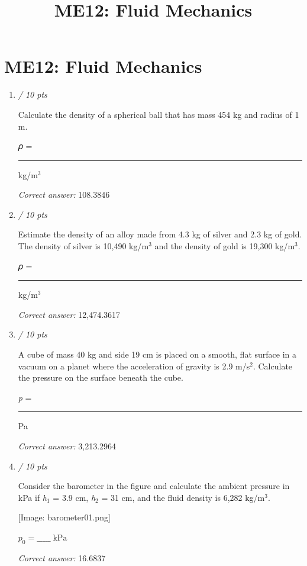 \documentclass[11pt]{article}
\title{ME12: Fluid Mechanics}
\author{}
\date{}
\begin{document}
\maketitle

\section*{ME12: Fluid Mechanics}

\begin{enumerate}[leftmargin=*,label=\textbf{Question \arabic*.}]
\item \hfill \textit{/ 10 pts}

Calculate the density of a spherical ball that has mass 454 kg and radius of 1 m.



𝜌 = \rule{2cm}{0.4pt} kg/m$^{3}$

\textit{Correct answer: } 108.3846

\item \hfill \textit{/ 10 pts}

Estimate the density of an alloy made from 4.3 kg of silver and 2.3 kg of gold. The density of silver is 10,490 kg/m$^{3}$ and the density of gold is 19,300 kg/m$^{3}$.



𝜌 = \rule{2cm}{0.4pt} kg/m$^{3}$

\textit{Correct answer: } 12,474.3617

\item \hfill \textit{/ 10 pts}

A cube of mass 40 kg and side 19 cm is placed on a smooth, flat surface in a vacuum on a planet where the acceleration of gravity is 2.9 m/s$^{2}$. Calculate the pressure on the surface beneath the cube.



\emph{p} =\rule{2cm}{0.4pt}Pa

\textit{Correct answer: } 3,213.2964

\item \hfill \textit{/ 10 pts}

Consider the barometer in the figure and calculate the ambient pressure in kPa if \emph{h}$_{1}$ = 3.9 cm, \emph{h}$_{2}$ = 31 cm, and the fluid density is 6,282 kg/m$^{3}$.

[Image: barometer01.png]



$p_0=\_\_\_\_\_\;\mathrm{kPa}$

\textit{Correct answer: } 16.6837


\end{enumerate}
\end{document}
